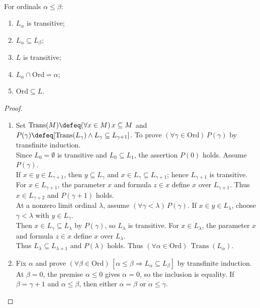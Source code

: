 \begin{proposition} \label{prop:basic-constructible-hierarchy-properties} \\
For ordinals $\alpha\leq\beta$:
\begin{enumerate}[label=(\roman*)]
\setlength{\itemsep}{0pt}
\item $L_\alpha$ is transitive;
\item $L_\alpha\subseteq L_\beta$;
\item $L$ is transitive;
\item $L_\alpha\cap\mathrm{Ord}=\alpha$;
\item $\mathrm{Ord}\subseteq L$.
\end{enumerate}
\begin{proof}
\begin{enumerate}[label=(\roman*)]
\setlength{\itemsep}{0pt}
\item Set $\operatorname{Trans}(M)\defeq(\forall x\in M)\,x\subseteq M$ and $P(\gamma)\defeq[\operatorname{Trans}(L_\gamma)\land L_\gamma\subseteq L_{\gamma+1}]$. To prove $(\forall\gamma\in\mathrm{Ord})\,P(\gamma)$ by transfinite induction.\\
Since $L_0=\emptyset$ is transitive and $L_0\subseteq L_1$, the assertion $P(0)$ holds. Assume $P(\gamma)$.\\
If $x\in y\in L_{\gamma+1}$, then $y\subseteq L_\gamma$ and $x\in L_\gamma\subseteq L_{\gamma+1}$; hence $L_{\gamma+1}$ is transitive.\\
For $x\in L_{\gamma+1}$, the parameter $x$ and formula $z\in x$ define $x$ over $L_{\gamma+1}$. Thus $x\in L_{\gamma+2}$ and $P(\gamma+1)$ holds.\\
At a nonzero limit ordinal $\lambda$, assume $(\forall\gamma<\lambda)\,P(\gamma)$. If $x\in y\in L_\lambda$, choose $\gamma<\lambda$ with $y\in L_\gamma$.\\
Then $x\in L_\gamma\subseteq L_\lambda$ by $P(\gamma)$, so $L_\lambda$ is transitive. For $x\in L_\lambda$, the parameter $x$ and formula $z\in x$ define $x$ over $L_\lambda$.\\
Thus $L_\lambda\subseteq L_{\lambda+1}$ and $P(\lambda)$ holds. Thus $(\forall\alpha\in\mathrm{Ord})\,\operatorname{Trans}(L_\alpha)$.
\item Fix $\alpha$ and prove $(\forall\beta\in\mathrm{Ord})\,[\alpha\leq\beta\Rightarrow L_\alpha\subseteq L_\beta]$ by transfinite induction.\\
At $\beta=0$, the premise $\alpha\leq0$ gives $\alpha=0$, so the inclusion is equality. If $\beta=\gamma+1$ and $\alpha\leq\beta$, then either $\alpha=\beta$ or $\alpha\leq\gamma$.\\

\end{enumerate}
\end{proof}
\end{proposition}
